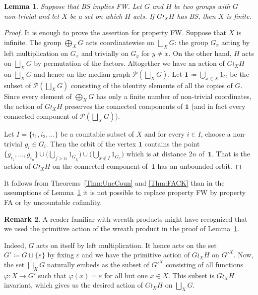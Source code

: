 \documentclass[a4paper]{article}
\newtheorem{lem}{Lemma}[section]
\theoremstyle{definition}
\newtheorem{rem}[lem]{Remark}
\theoremstyle{remark}%
\newcommand*{\powerset}[1]{\mathcal P(#1)}
\begin{document}
%
%
\begin{lem}\label{Lemma:XFinite}
Suppose that BS implies FW.
Let $G$ and $H$ be two groups with $G$ non-trivial and let $X$ be a set on which $H$ acts.
If $G\wr_XH$ has BS, then $X$ is finite.
\end{lem}
\begin{proof}
It is enough to prove the assertion for property FW.
Suppose that $X$ is infinite.
The group $\bigoplus_XG$ acts coordinatewise on  $\bigsqcup_XG$: the group $G_x$ acting by left multiplication on $G_x$ and trivially on $G_y$ for $y\neq x$. On the other hand, $H$ acts on $\bigsqcup_XG$ by permutation of the factors.
Altogether we have an action of $G\wr_XH$ on $\bigsqcup_XG$ and hence on the median graph $\powerset{\bigsqcup_XG}$.
Let $\mathbf 1\coloneqq\bigcup_{x\in X} 1_{G}$ be the subset of $\powerset{\bigsqcup_XG}$ consisting of the identity elements of all the copies of $G$.
Since every element of $\bigoplus_XG$ has only a finite number of non-trivial coordinates, the action of $G\wr_XH$ preserves the connected components of $\mathbf 1$ (and in fact every connected component of $\powerset{\bigsqcup_XG}$).

Let $I=\{i_1,i_2,\dots\}$ be a countable subset of $X$ and for every $i\in I$, choose a non-trivial $g_i\in G_{i}$.
Then the orbit of the vertex $\mathbf 1$ contains the point $\{g_{i_1},\dots, g_{i_n}\}\cup\bigl(\bigcup_{j>n} 1_{G_{j_i}}\bigr)\cup\bigl(\bigcup_{x\notin I} 1_{G_{x}}\bigr)$ which is at distance $2n$ of~$\mathbf 1$.
That is the action of $G\wr_XH$ on the connected component of~$\mathbf 1$ has an unbounded orbit.
\end{proof}
%
%
It follows from Theorems~\ref{Thm:UncCoun} and \ref{Thm:FACK} than in the assumptions of Lemma~\ref{Lemma:XFinite} it is not possible to replace property FW by property FA or by uncountable cofinality.
%
%
\begin{rem}\label{Rem:Actionsb}
A reader familiar with wreath products might have recognized that we used the primitive action of the wreath product in the proof of Lemma~\ref{Lemma:XFinite}.

Indeed, $G$ acts on itself by left multiplication.
It hence acts on the set $G'\coloneqq G\sqcup\{\varepsilon\}$ by fixing $\varepsilon$ and we have the primitive action of $G\wr_{X} H$ on $G'^X$.
Now, the set $\bigsqcup_XG$ naturally embeds as the subset of $G'^X$ consisting of all functions $\varphi\colon X\to G'$ such that $\varphi(x)=\varepsilon$ for all but one $x\in X$.
This subset is $G\wr_{X} H$ invariant, which gives us the desired action of $G\wr_{X} H$ on $\bigsqcup_XG$.
\end{rem}
\end{document}

